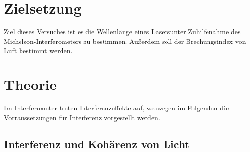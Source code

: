 \section{Zielsetzung}
\label{Zielsetzung}
Ziel dieses Versuches ist es die Wellenlänge eines Lasersunter Zuhilfenahme des Michelson-Interferometers zu bestimmen.
Außerdem soll der Brechungsindex von Luft bestimmt werden.

\section{Theorie}
\label{sec:Theorie}
Im Interferometer treten Interferenzeffekte auf, weswegen im Folgenden die Vorraussetzungen für Interferenz vorgestellt werden.

\subsection{Interferenz und Kohärenz von Licht}
\label{Int&Ko_theo}

